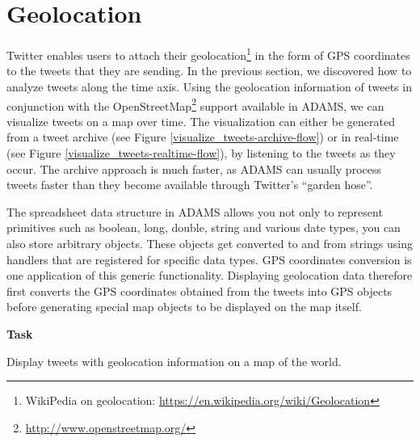 \documentclass[a4paper,10pt]{book}
\newcommand{\heading}[1]{
  \vspace{0.3cm} \noindent \textbf{#1} \newline
}
\begin{document}
\clearpage
\newpage
\section{Geolocation}
Twitter enables users to attach their geolocation\footnote{WikiPedia on geolocation: \url{https://en.wikipedia.org/wiki/Geolocation}{}} in the form of GPS coordinates to the tweets that they are sending. In the previous section, we discovered how to analyze tweets along the time axis. Using the geolocation information of tweets in conjunction with the OpenStreetMap\footnote{\url{http://www.openstreetmap.org/}{}} support available in ADAMS, we can visualize tweets on a map over time. The visualization can either be generated from a tweet archive (see Figure \ref{visualize_tweets-archive-flow}) or in real-time (see Figure \ref{visualize_tweets-realtime-flow}), by listening to the tweets as they occur. The archive approach is much faster, as ADAMS can usually process tweets faster than they become available through Twitter's ``garden hose''.

The spreadsheet data structure in ADAMS allows you not only to represent primitives such as boolean, long, double, string and various date types, you can also store arbitrary objects. These objects get converted to and from strings using handlers that are registered for specific data types. GPS coordinates conversion is one application of this generic functionality. Displaying geolocation data therefore first converts the GPS coordinates obtained from the tweets into GPS objects before generating special map objects to be displayed on the map itself.

\heading{Task}
Display tweets with geolocation information on a map of the world.
\end{document}
